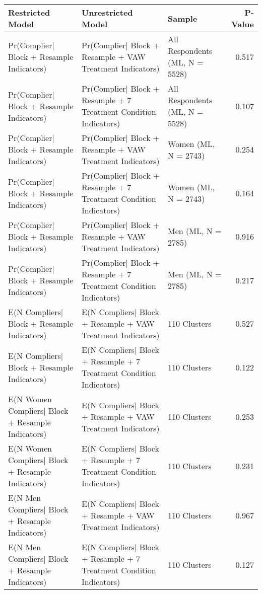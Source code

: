 
\begin{tabular}{l|l|l|r}
\hline
Restricted Model & Unrestricted Model & Sample & P-Value\\
\hline
Pr(Complier| Block + Resample Indicators) & Pr(Complier| Block + Resample +  VAW Treatment Indicators) & All Respondents (ML, N = 5528) & 0.517\\
\hline
Pr(Complier| Block + Resample Indicators) & Pr(Complier| Block + Resample + 7 Treatment Condition Indicators) & All Respondents (ML, N = 5528) & 0.107\\
\hline
Pr(Complier| Block + Resample Indicators) & Pr(Complier| Block + Resample +  VAW Treatment Indicators) & Women (ML, N = 2743) & 0.254\\
\hline
Pr(Complier| Block + Resample Indicators) & Pr(Complier| Block + Resample + 7 Treatment Condition Indicators) & Women (ML, N = 2743) & 0.164\\
\hline
Pr(Complier| Block + Resample Indicators) & Pr(Complier| Block + Resample +  VAW Treatment Indicators) & Men (ML, N = 2785) & 0.916\\
\hline
Pr(Complier| Block + Resample Indicators) & Pr(Complier| Block + Resample + 7 Treatment Condition Indicators) & Men (ML, N = 2785) & 0.217\\
\hline
E(N Compliers| Block + Resample Indicators) & E(N Compliers| Block + Resample +  VAW Treatment Indicators) & 110 Clusters & 0.527\\
\hline
E(N Compliers| Block + Resample Indicators) & E(N Compliers| Block + Resample + 7 Treatment Condition Indicators) & 110 Clusters & 0.122\\
\hline
E(N Women Compliers| Block + Resample Indicators) & E(N Compliers| Block + Resample +  VAW Treatment Indicators) & 110 Clusters & 0.253\\
\hline
E(N Women Compliers| Block + Resample Indicators) & E(N Compliers| Block + Resample + 7 Treatment Condition Indicators) & 110 Clusters & 0.231\\
\hline
E(N Men Compliers| Block + Resample Indicators) & E(N Compliers| Block + Resample +  VAW Treatment Indicators) & 110 Clusters & 0.967\\
\hline
E(N Men Compliers| Block + Resample Indicators) & E(N Compliers| Block + Resample + 7 Treatment Condition Indicators) & 110 Clusters & 0.127\\
\hline
\end{tabular}
